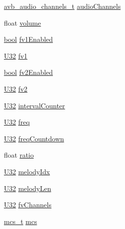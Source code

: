 \begin{DoxyCompactItemize}
\item 
\hyperlink{openavb__audio__pub_8h_a8cc6b9a1352da050ead620139f49acc4}{avb\+\_\+audio\+\_\+channels\+\_\+t} \hyperlink{structpvt__data__t_ad8a7767f3583795147d57c7252554dd9}{audio\+Channels}
\item 
float \hyperlink{structpvt__data__t_a016abda2855c77dcc1630f9d2f9f8d18}{volume}
\item 
\hyperlink{avb__gptp_8h_af6a258d8f3ee5206d682d799316314b1}{bool} \hyperlink{structpvt__data__t_aeb60b20626751ef7c9c0046ed026a681}{fv1\+Enabled}
\item 
\hyperlink{openavb__types__base__pub_8h_a696390429f2f3b644bde8d0322a24124}{U32} \hyperlink{structpvt__data__t_af0d968d4212147c6c8f84d8bfaa1de61}{fv1}
\item 
\hyperlink{avb__gptp_8h_af6a258d8f3ee5206d682d799316314b1}{bool} \hyperlink{structpvt__data__t_a27b884756b6fc446de19b96a3fab08cd}{fv2\+Enabled}
\item 
\hyperlink{openavb__types__base__pub_8h_a696390429f2f3b644bde8d0322a24124}{U32} \hyperlink{structpvt__data__t_a7cc03784ca8e5c2407ffcf0b9ee62236}{fv2}
\item 
\hyperlink{openavb__types__base__pub_8h_a696390429f2f3b644bde8d0322a24124}{U32} \hyperlink{structpvt__data__t_a21c6933b90f224d67ff83bf224c7d313}{interval\+Counter}
\item 
\hyperlink{openavb__types__base__pub_8h_a696390429f2f3b644bde8d0322a24124}{U32} \hyperlink{structpvt__data__t_ab5856fa4ff4ce7d9aff90cd3f36a1724}{freq}
\item 
\hyperlink{openavb__types__base__pub_8h_a696390429f2f3b644bde8d0322a24124}{U32} \hyperlink{structpvt__data__t_afb4d211f6a7e2be34887605bd2cbe5be}{freq\+Countdown}
\item 
float \hyperlink{structpvt__data__t_a207ad05f99cc72068a92358861ff5e71}{ratio}
\item 
\hyperlink{openavb__types__base__pub_8h_a696390429f2f3b644bde8d0322a24124}{U32} \hyperlink{structpvt__data__t_a4076c3857ea8e7812c5d51caab0c961e}{melody\+Idx}
\item 
\hyperlink{openavb__types__base__pub_8h_a696390429f2f3b644bde8d0322a24124}{U32} \hyperlink{structpvt__data__t_a8a601d1e0523a72fef56a827cf93dd77}{melody\+Len}
\item 
\hyperlink{openavb__types__base__pub_8h_a696390429f2f3b644bde8d0322a24124}{U32} \hyperlink{structpvt__data__t_a726c75c30e70594b870fea648d2b5a89}{fv\+Channels}
\item 
\hyperlink{structmcs__t}{mcs\+\_\+t} \hyperlink{structpvt__data__t_aeae67b5199bbd13cc6ba11f25244aca4}{mcs}

\end{DoxyCompactItemize}
